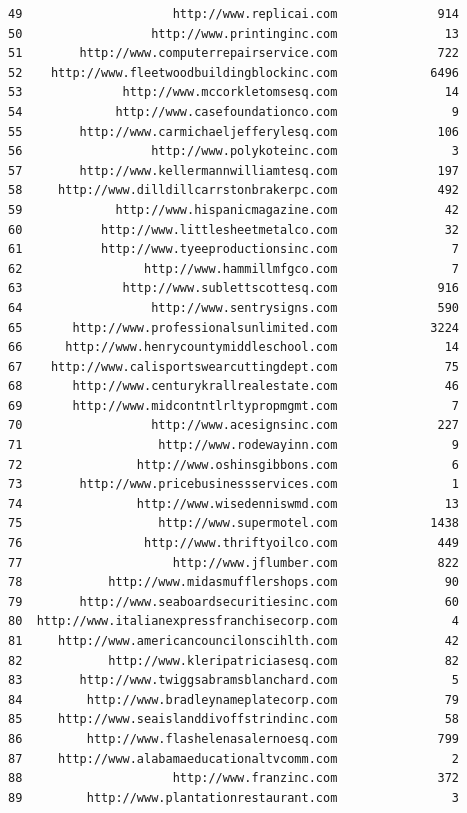 \documentclass[
  12pt,
]{article}
\begin{document}
\begin{verbatim}
49                     http://www.replicai.com              914
50                  http://www.printinginc.com               13
51        http://www.computerrepairservice.com              722
52    http://www.fleetwoodbuildingblockinc.com             6496
53              http://www.mccorkletomsesq.com               14
54             http://www.casefoundationco.com                9
55        http://www.carmichaeljefferylesq.com              106
56                  http://www.polykoteinc.com                3
57        http://www.kellermannwilliamtesq.com              197
58     http://www.dilldillcarrstonbrakerpc.com              492
59             http://www.hispanicmagazine.com               42
60           http://www.littlesheetmetalco.com               32
61           http://www.tyeeproductionsinc.com                7
62                 http://www.hammillmfgco.com                7
63              http://www.sublettscottesq.com              916
64                  http://www.sentrysigns.com              590
65       http://www.professionalsunlimited.com             3224
66      http://www.henrycountymiddleschool.com               14
67    http://www.calisportswearcuttingdept.com               75
68       http://www.centurykrallrealestate.com               46
69       http://www.midcontntlrltypropmgmt.com                7
70                  http://www.acesignsinc.com              227
71                   http://www.rodewayinn.com                9
72                http://www.oshinsgibbons.com                6
73        http://www.pricebusinessservices.com                1
74                http://www.wisedenniswmd.com               13
75                   http://www.supermotel.com             1438
76                 http://www.thriftyoilco.com              449
77                     http://www.jflumber.com              822
78            http://www.midasmufflershops.com               90
79        http://www.seaboardsecuritiesinc.com               60
80  http://www.italianexpressfranchisecorp.com                4
81     http://www.americancouncilonscihlth.com               42
82            http://www.kleripatriciasesq.com               82
83        http://www.twiggsabramsblanchard.com                5
84         http://www.bradleynameplatecorp.com               79
85     http://www.seaislanddivoffstrindinc.com               58
86         http://www.flashelenasalernoesq.com              799
87     http://www.alabamaeducationaltvcomm.com                2
88                     http://www.franzinc.com              372
89         http://www.plantationrestaurant.com                3

\end{verbatim}
\end{document}
